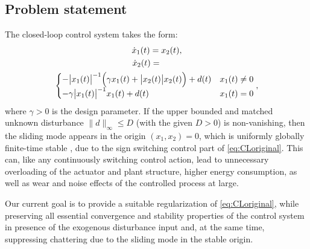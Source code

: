 \documentclass[letterpaper, 10 pt, conference]{ieeeconf}  %
\begin{document}
\subsection*{Problem statement}

The closed-loop control system \cite{ruderman2024robust} takes the form:
\begin{gather}
\dot{x}_1(t)=x_{2}(t),\label{eq:CLoriginal}\\
\dot{x}_2(t)=\qquad\;\;\nonumber \\
\begin{cases}
-\bigl|x_{1}(t)\bigr|^{-1}\Bigl(\gamma x_{1}(t)+\bigl|x_{2}(t)\bigr|x_{2}(t)\Bigr)+d(t) & x_{1}(t)\ne0\\
-\gamma\bigl|x_{1}(t)\bigr|^{-1}x_{1}(t)+d(t) & x_{1}(t)=0
\end{cases},\nonumber
\end{gather}
where $\gamma>0$ is the design parameter. If the upper bounded and matched unknown disturbance 
$\|d\|_{\infty}\leq D$ (with the given $D>0$) is non-vanishing, then the sliding mode appears
in the origin $(x_1,x_2)=0$, which is uniformly globally finite-time stable \cite{ruderman2024robust}, due to the sign switching control part of \eqref{eq:CLoriginal}. This can, like any continuously switching control action, lead to unnecessary overloading of the actuator and plant structure, higher energy consumption, as well as wear and noise effects of the controlled process at large.     

Our current goal is to provide a suitable regularization of \eqref{eq:CLoriginal}, while preserving all essential convergence and stability properties of the control system in presence of the exogenous disturbance input and, at the same time, suppressing chattering due to the sliding mode in the stable origin.       
\end{document}
